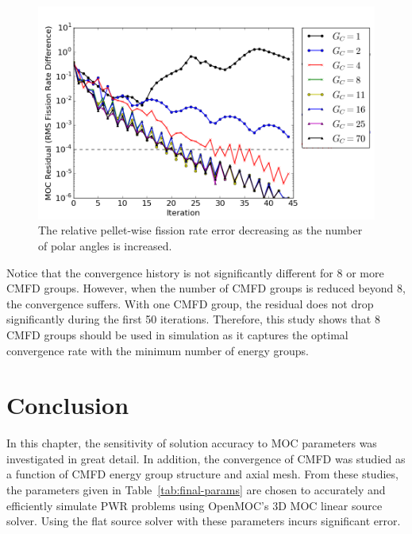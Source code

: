\begin{figure}[h!]
	\centering
	\includegraphics[width=0.9\linewidth]{figures/results/sensitivity/cmfd-groups.png}
	\caption[]{The relative pellet-wise fission rate error decreasing as the number of polar angles is increased.}
	\label{fig:cmfd-energy-groups}
\end{figure}

Notice that the convergence history is not significantly different for 8 or more \ac{CMFD} groups. However, when the number of \ac{CMFD} groups is reduced beyond 8, the convergence suffers. With one \ac{CMFD} group, the residual does not drop significantly during the first 50 iterations. Therefore, this study shows that 8 \ac{CMFD} groups should be used in simulation as it captures the optimal convergence rate with the minimum number of energy groups.

\section{Conclusion}
\label{sec:sensitivity-conclusion}

In this chapter, the sensitivity of solution accuracy to \ac{MOC} parameters was investigated in great detail. In addition, the convergence of \ac{CMFD} was studied as a function of \ac{CMFD} energy group structure and axial mesh. From these studies, the parameters given in Table~\ref{tab:final-params} are chosen to accurately and efficiently simulate \ac{PWR} problems using OpenMOC's 3D \ac{MOC} linear source solver. Using the flat source solver with these parameters incurs significant error.

